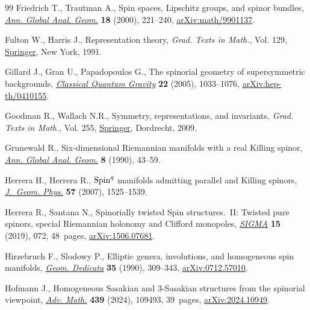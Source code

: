 \documentclass[pdftex]{sigma}
\numberwithin{equation}{section}
\begin{document}
\begin{thebibliography}{99}
Friedrich T., Trautman A., Spin spaces, {L}ipschitz groups, and spinor bundles,
 \href{https://doi.org/10.1023/A:1006713405277}{\textit{Ann. Global Anal. Geom.}} \textbf{18} (2000), 221--240,
 \href{https://arxiv.org/abs/math/9901137}{arXiv:math/9901137}.

Fulton W., Harris J., Representation theory, \textit{Grad. Texts in Math.},
 Vol. 129, \href{https://doi.org/10.1007/978-1-4612-0979-9}{Springer}, New York, 1991.

Gillard J., Gran U., Papadopoulos G., The spinorial geometry of supersymmetric
 backgrounds, \href{https://doi.org/10.1088/0264-9381/22/6/009}{\textit{Classical Quantum Gravity}} \textbf{22} (2005),
 1033--1076, \href{https://arxiv.org/abs/hep-th/0410155}{arXiv:hep-th/0410155}.

Goodman R., Wallach N.R., Symmetry, representations, and invariants,
 \textit{Grad. Texts in Math.}, Vol. 255, \href{https://doi.org/10.1007/978-0-387-79852-3}{Springer}, Dordrecht, 2009.

Grunewald R., Six-dimensional {R}iemannian manifolds with a real {K}illing
 spinor, \href{https://doi.org/10.1007/BF00055017}{\textit{Ann. Global Anal. Geom.}} \textbf{8} (1990), 43--59.

Herrera H., Herrera R., {${\rm Spin}^q$} manifolds admitting parallel and
 {K}illing spinors, \href{https://doi.org/10.1016/j.geomphys.2007.01.002}{\textit{J.~Geom. Phys.}} \textbf{57} (2007), 1525--1539.

Herrera R., Santana N., Spinorially twisted {S}pin structures.~{II}: {T}wisted
 pure spinors, special {R}iemannian holonomy and {C}lifford monopoles,
 \href{https://doi.org/10.3842/SIGMA.2019.072}{\textit{SIGMA}} \textbf{15} (2019), 072, 48~pages, \href{https://arxiv.org/abs/1506.07681}{arXiv:1506.07681}.

Hirzebruch F., Slodowy P., Elliptic genera, involutions, and homogeneous spin
 manifolds, \href{https://doi.org/10.1007/BF00147351}{\textit{Geom. Dedicata}} \textbf{35} (1990), 309--343,
 \href{https://arxiv.org/abs/0712.57010}{arXiv:0712.57010}.

Hofmann J., Homogeneous {S}asakian and 3-{S}asakian structures from the
 spinorial viewpoint, \href{https://doi.org/10.1016/j.aim.2024.109493}{\textit{Adv. Math.}} \textbf{439} (2024), 109493,
 39~pages, \href{https://arxiv.org/abs/2024.10949}{arXiv:2024.10949}.


\end{thebibliography}
\end{document}

